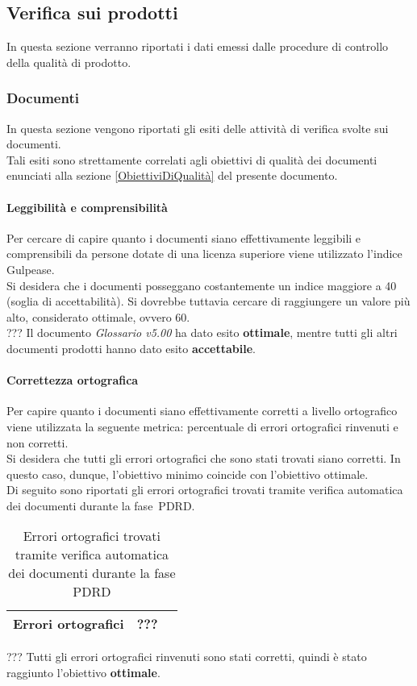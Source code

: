 \documentclass[../PianoDiQualifica.tex]{subfiles}
\begin{document}
\begin{appendices}
			
	\subsection{Verifica sui prodotti}
	In questa sezione verranno riportati i dati emessi dalle procedure di controllo della qualità di prodotto\g.
	
		\subsubsection{Documenti}
		In questa sezione vengono riportati gli esiti delle attività di verifica svolte sui documenti.\\
		Tali esiti sono strettamente correlati agli obiettivi di qualità dei documenti enunciati alla sezione \ref{ObiettiviDiQualità} del presente documento.
			
			\paragraph{Leggibilità e comprensibilità}
			Per cercare di capire quanto i documenti siano effettivamente leggibili e comprensibili da persone dotate di una licenza superiore viene utilizzato l'indice Gulpease\g.\\
			Si desidera che i documenti posseggano costantemente un indice maggiore a 40 (soglia di accettabilità). Si dovrebbe tuttavia cercare di raggiungere un valore più alto, considerato ottimale, ovvero 60.\\
			??? Il documento \textit{Glossario v5.00} ha dato esito \textbf{ottimale}, mentre tutti gli altri documenti prodotti hanno dato esito \textbf{accettabile}.
			
			\paragraph{Correttezza ortografica}
			Per capire quanto i documenti siano effettivamente corretti a livello ortografico viene utilizzata la seguente metrica: percentuale di errori ortografici rinvenuti e non corretti.\\
			Si desidera che tutti gli errori ortografici che sono stati trovati siano corretti. In questo caso, dunque, l'obiettivo minimo coincide con l'obiettivo ottimale.\\
			Di seguito sono riportati gli errori ortografici trovati tramite verifica automatica dei documenti durante la fase\g\ PDRD.
			\begin{table}[H]
				\centering
				\begin{tabular}{l * {2}{c}}
					\midrule
					Errori ortografici & ??? \\
					\midrule
				\end{tabular}
				\caption{Errori ortografici trovati tramite verifica automatica dei documenti durante la fase PDRD}
				\label{tab:errori_automatica}
			\end{table}
			??? Tutti gli errori ortografici rinvenuti sono stati corretti, quindi è stato raggiunto l'obiettivo \textbf{ottimale}.
			

\end{appendices}
\end{document}
